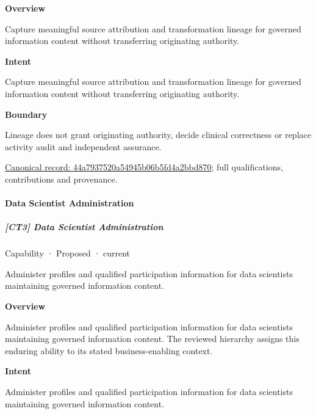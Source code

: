 \textbf{Overview}



Capture meaningful source attribution and transformation lineage for governed information content without transferring originating authority.



\textbf{Intent}



Capture meaningful source attribution and transformation lineage for governed information content without transferring originating authority.



\textbf{Boundary}



Lineage does not grant originating authority, decide clinical correctness or replace activity audit and independent assurance.


{\footnotesize \href{../../../../continuum/strategy/capability/44a7937520a54945b06b5fd4a2bbd870.md}{Canonical record: 44a7937520a54945b06b5fd4a2bbd870}; full qualifications, contributions and provenance.}\par
\paragraph{Data Scientist Administration}

\subparagraph{[CT3] Data Scientist Administration}

\label{element:3bb1a11fba234717bf40c9e6452f401a}
{\small Capability · Proposed · current}\par

Administer profiles and qualified participation information for data scientists maintaining governed information content.



\textbf{Overview}



Administer profiles and qualified participation information for data scientists maintaining governed information content. The reviewed hierarchy assigns this enduring ability to its stated business-enabling context.



\textbf{Intent}



Administer profiles and qualified participation information for data scientists maintaining governed information content.



